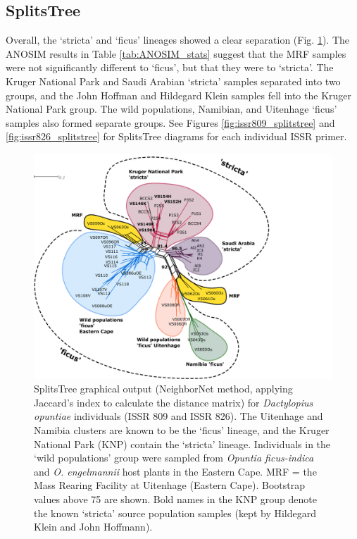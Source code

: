 \subsection{SplitsTree}
Overall, the `stricta' and `ficus' lineages showed a clear separation (Fig. \ref{fig:splitsTree}). The ANOSIM results in Table \ref{tab:ANOSIM_stats} suggest that the MRF samples were not significantly different to `ficus', but that they were to `stricta'.
The Kruger National Park and Saudi Arabian `stricta' samples separated into two groups, and the John Hoffman and Hildegard Klein samples fell into the Kruger National Park group. The wild populations, Namibian, and Uitenhage `ficus' samples also formed separate groups. See Figures \ref{fig:issr809_splitstree} and \ref{fig:issr826_splitstree} for SplitsTree diagrams for each individual ISSR primer.

\vspace{0.5cm}
\begin{figure}[H]
	\centering
	\includegraphics[scale =0.85]{Images/opuntiae_for_splitstree.pdf}
	\caption{SplitsTree graphical output (NeighborNet method, applying Jaccard's index to calculate the distance matrix) for \textit{Dactylopius opuntiae} individuals (ISSR 809 and ISSR 826). The Uitenhage and Namibia clusters are known to be the `ficus' lineage, and the Kruger National Park (KNP) contain the `stricta' lineage. Individuals in the `wild populations' group were sampled from \textit{Opuntia ficus-indica} and \textit{O. engelmannii} host plants in the Eastern Cape. MRF = the Mass Rearing Facility at Uitenhage (Eastern Cape). Bootstrap values above 75 are shown. Bold names in the KNP group denote the known `stricta' source population samples (kept by Hildegard Klein and John Hoffmann).}
	\label{fig:splitsTree}
\end{figure}

